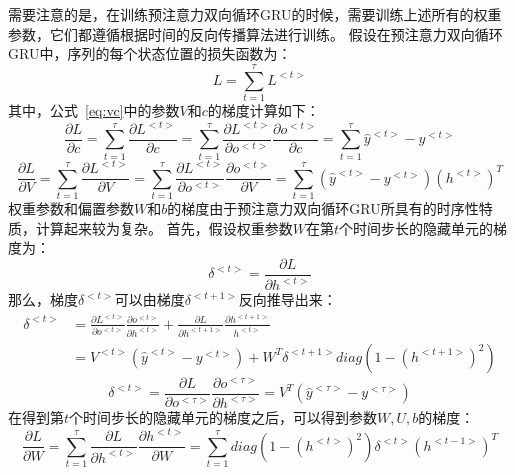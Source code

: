 需要注意的是，在训练预注意力双向循环GRU的时候，需要训练上述所有的权重参数，它们都遵循根据时间的反向传播算法进行训练。
假设在预注意力双向循环GRU中，序列的每个状态位置的损失函数为：
\begin{equation}
    L=\sum_{t=1}^{\tau }L^{<t>}
\end{equation}
其中，公式~\ref{eq:vc}中的参数${V}$和${c}$的梯度计算如下：
\begin{equation}
    \frac{\partial L}{\partial c}=\sum_{t=1}^{\tau }\frac{\partial L^{<t>}}{\partial c}=\sum_{t=1}^{\tau }\frac{\partial L^{<t>}}{\partial o^{<t>}}\frac{\partial o^{<t>}}{\partial c}=\sum_{t=1}^{\tau }\widehat{y}^{<t>}-y^{<t>}
\end{equation}
\begin{equation}
    \frac{\partial L}{\partial V}=\sum_{t=1}^{\tau }\frac{\partial L^{<t>}}{\partial V}=\sum_{t=1}^{\tau }\frac{\partial L^{<t>}}{\partial o^{<t>}}\frac{\partial o^{<t>}}{\partial V}=\sum_{t=1}^{\tau }\left ( \widehat{y}^{<t>}-y^{<t>} \right )\left ( h^{<t>} \right )^{T}
\end{equation}
权重参数和偏置参数${W}$和${b}$的梯度由于预注意力双向循环GRU所具有的时序性特质，计算起来较为复杂。
首先，假设权重参数${W}$在第${t}$个时间步长的隐藏单元的梯度为：
\begin{equation}
    \delta ^{<t>}=\frac{\partial L}{\partial h^{<t>}}
\end{equation}
那么，梯度${\delta ^{<t>}}$可以由梯度${\delta ^{<t+1>}}$反向推导出来：
\begin{equation}
    \begin{aligned}
        \delta ^{<t>} & =\frac{\partial L^{<t>}}{\partial o^{<t>}}\frac{\partial o^{<t>}}{\partial h^{<t>}}+\frac{\partial L}{\partial h^{<t+1>}}\frac{\partial h^{<t+1>}}{h^{<t>}} \\
        & =V^{<t>}\left ( \widehat{y}^{<t>}-y^{<t>} \right )+W^{T}\delta ^{<t+1>}diag\left ( 1-\left ( h^{<t+1>} \right )^{2} \right)
    \end{aligned}
\end{equation}
\begin{equation}
    \delta ^{<t>}=\frac{\partial L}{\partial o^{<\tau >}}\frac{\partial o^{<\tau >}}{\partial h^{<\tau >}}=V^{T}\left ( \widehat{y}^{<\tau >}-y^{<\tau >} \right )
\end{equation}
在得到第${t}$个时间步长的隐藏单元的梯度之后，可以得到参数${W,U,b}$的梯度：
\begin{equation}
    \frac{\partial L}{\partial W}=\sum_{t=1}^{\tau }\frac{\partial L}{\partial h^{<t>}}\frac{\partial h^{<t>}}{\partial W}=\sum_{t=1}^{\tau }diag\left ( 1-\left ( h^{<t>} \right )^{2} \right )\delta^{<t>} \left ( h^{<t-1>} \right )^{T}
\end{equation}
